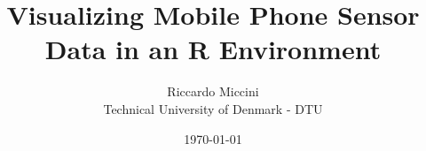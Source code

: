 \documentclass[12pt, a4paper, final]{report}
\title{Visualizing Mobile Phone Sensor Data in an R Environment}
\author{Riccardo Miccini  \\
	Technical University of Denmark - DTU \\
	}
\date{\today}
\begin{document}
\maketitle



\tableofcontents











\nocite{*}
\printbibliography


\end{document}
